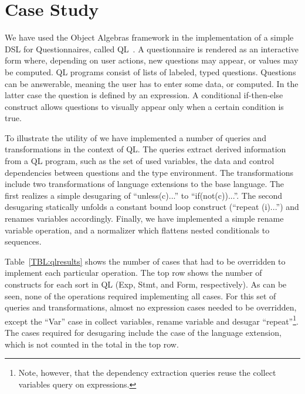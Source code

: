 \section{Case Study}

We have used the Object Algebras framework in the implementation of a simple DSL for Questionnaires, called QL~\cite{gouseti14extensible}.
A questionnaire is rendered as an interactive form where, depending on user actions, new questions may appear, or values may be computed. 
QL programs consist of lists of labeled, typed questions.
Questions can be answerable, meaning the user has to enter some data, or computed.
In the latter case the question is defined by an expression.
A conditional if-then-else construct allows questions to visually appear only when a certain condition is true. 

To illustrate the utility of \name we have implemented a number of queries and transformations in the context of QL. The queries extract derived information from a QL program, such as the set of used variables, the data and control dependencies between questions and the type environment.
The transformations include two transformations of language extensions to the base language.
The first realizes a simple desugaring of ``unless(c){...}'' to ``if(not(c)){...}''.
The second desugaring statically unfolds a constant bound loop construct (``repeat (i){...}'') and renames variables accordingly.
Finally, we have implemented a simple rename variable operation, and a normalizer which flattens nested conditionals to sequences.  

Table~\ref{TBL:qlresults} shows the number of cases that had to be overridden to implement each particular operation. The top row shows the number of  constructs for each sort in QL (Exp, Stmt, and Form, respectively).
As can be seen, none of the operations required implementing all cases.
For this set of queries and transformations, almost no expression cases needed to be overridden, except the ``Var'' case in collect variables, rename variable and desugar ``repeat''\footnote{Note, however, that the dependency extraction queries reuse the collect variables query on expressions.}.
The cases required for desugaring include the case of the language extension, which is not counted in the total in the top row. 


